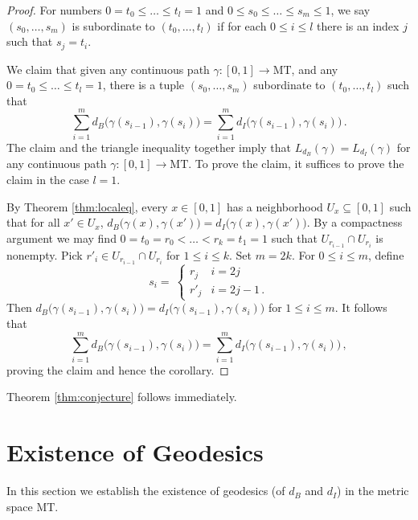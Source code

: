 \documentclass{article}
\theoremstyle{definition}
\newcommand{\MT}{\mathrm{MT}}
\begin{document}
\begin{proof}
    For numbers $0= t_0 \leq \ldots \leq t_l = 1$ and $0\leq s_0\leq \ldots \leq s_m\leq 1$, we say $(s_0,\ldots,s_m)$ is subordinate to $(t_0,\ldots,t_l)$ if for each $0\leq i\leq l$ there is an index $j$ such that $s_j =t_i$.

    We claim that given any continuous path $\gamma:[0,1] \to \MT$, and any $0= t_0 \leq \ldots \leq t_l = 1$, there is a tuple $(s_0,\ldots,s_m)$ subordinate to $(t_0,\ldots,t_l)$ such that
\begin{equation}
\label{eqn:subordinatedist}
    \sum_{i=1}^md_B\big(\gamma(s_{i-1}),\gamma(s_i)\big) = \sum_{i=1}^m d_I\big(\gamma(s_{i-1}),\gamma(s_i)\big)\,.
\end{equation}
The claim and the triangle inequality together imply that $L_{d_B}(\gamma) = L_{d_I}(\gamma)$ for any continuous path $\gamma:[0,1] \to \MT$. To prove the claim, it suffices to prove the claim in the case $l = 1$.

By Theorem \ref{thm:localeq}, every $x\in [0,1]$ has a neighborhood $U_x \subseteq [0,1]$ such that for all $x' \in U_x$, $d_B\big(\gamma(x), \gamma(x')\big) = d_I\big(\gamma(x),\gamma(x')\big)$. By a compactness argument we may find $0 = t_0 = r_0 < \ldots< r_k = t_1 = 1$ such that $U_{r_{i-1}} \cap U_{r_{i}}$ is nonempty. Pick $r'_i \in U_{r_{i-1}} \cap U_{r_{i}}$ for $1\leq i \leq k$. Set $m = 2k$. For $0 \leq i \leq m$, define
\begin{equation*}
    s_i = \ \begin{cases}
        r_j & i = 2j\\
        r'_j &i = 2j - 1\,.
    \end{cases}
\end{equation*}
Then $d_B\big(\gamma(s_{i-1}), \gamma(s_i)\big) = d_I\big(\gamma(s_{i-1}),\gamma(s_i)\big)$ for $1 \leq i \leq m$. It follows that
\begin{equation*}
    \sum_{i=1}^md_B\big(\gamma(s_{i-1}),\gamma(s_i)\big) = \sum_{i=1}^m d_I\big(\gamma(s_{i-1}),\gamma(s_i)\big)\,,
\end{equation*}
proving the claim and hence the corollary.
\end{proof}

Theorem \ref{thm:conjecture} follows immediately.

\section{Existence of Geodesics}
\label{sec:geodesics}
In this section we establish the existence of geodesics (of $d_B$ and $d_I$) in the metric space $\MT$.
\end{document}
